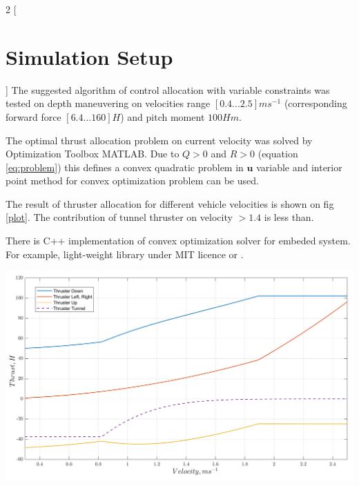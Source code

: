 \documentclass[a0,portrait]{a0poster}
\begin{document}
\vspace{1.5cm}
\begin{minipage}[t]{0.48\linewidth}
\begin{multicols}{2}
[
\section*{Simulation Setup}
]
The suggested algorithm of control allocation with variable constraints was tested on depth maneuvering on velocities range $[0.4...2.5]ms^{-1}$ (corresponding forward force $[6.4...160]H$) and pitch moment $100Hm$.

The optimal thrust allocation problem on current velocity was solved by Optimization Toolbox MATLAB. Due to $Q>0$ and $R>0$ (equation \ref{eq:problem}) this defines a convex quadratic problem in $\boldsymbol{u}$ variable and interior point method for convex optimization problem can be used.

The result of thruster allocation for different vehicle velocities is shown on fig \ref{plot}. The contribution of tunnel thruster on velocity $>1.4$ is less than.

There is C++ implementation of convex optimization solver for embeded system. For example, light-weight library under MIT licence \cite{repo} or \cite{qp_1}.
\end{multicols}
\end{minipage}
\hfill
\begin{minipage}[t]{0.48\linewidth}
\vspace{-14.0cm}
\centering
\includegraphics[width=\linewidth]{fig/Allocation_100My.png}
\label{plot}
\end{minipage}
\end{document}
